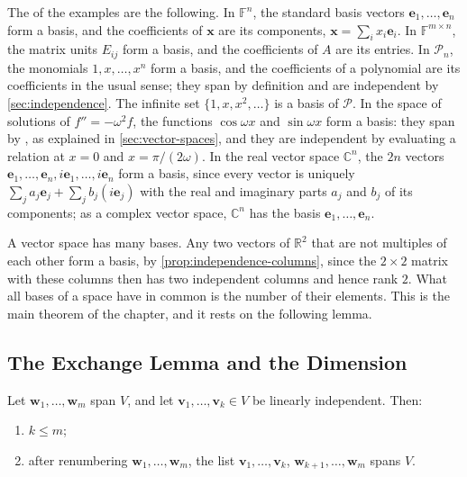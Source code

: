 The  of the examples are the following. In $\mathbb F^n$, the standard basis vectors $\mathbf e_1,\ldots,\mathbf e_n$ form a basis, and the coefficients of $\mathbf x$ are its components, $\mathbf x=\sum_ix_i\mathbf e_i$. In $\mathbb F^{m\times n}$, the matrix units $E_{ij}$ form a basis, and the coefficients of $A$ are its entries. In $\mathcal P_n$, the monomials $1,x,\ldots,x^n$ form a basis, and the coefficients of a polynomial are its coefficients in the usual sense; they span by definition and are independent by \cref{sec:independence}. The infinite set $\{1,x,x^2,\ldots\}$ is a basis of $\mathcal P$. In the space of solutions of $f''=-\omega^2f$, the functions $\cos\omega x$ and $\sin\omega x$ form a basis: they span by , as explained in \cref{sec:vector-spaces}, and they are independent by evaluating a relation at $x=0$ and $x=\pi/(2\omega)$. In the real vector space $\mathbb C^n$, the $2n$ vectors $\mathbf e_1,\ldots,\mathbf e_n,i\mathbf e_1,\ldots,i\mathbf e_n$ form a basis, since every vector is uniquely $\sum_ja_j\mathbf e_j+\sum_jb_j(i\mathbf e_j)$ with the real and imaginary parts $a_j$ and $b_j$ of its components; as a complex vector space, $\mathbb C^n$ has the basis $\mathbf e_1,\ldots,\mathbf e_n$.

A vector space has many bases. Any two vectors of $\mathbb R^2$ that are not multiples of each other form a basis, by \cref{prop:independence-columns}, since the $2\times2$ matrix with these columns then has two independent columns and hence rank $2$. What all bases of a space have in common is the number of their elements. This is the main theorem of the chapter, and it rests on the following lemma.

\subsection{The Exchange Lemma and the Dimension}

\begin{lemma}
\label{lem:steinitz}
Let $\mathbf w_1,\ldots,\mathbf w_m$ span $V$, and let $\mathbf v_1,\ldots,\mathbf v_k\in V$ be linearly independent. Then:
\begin{enumerate}
\item $k\le m$;
\item after renumbering $\mathbf w_1,\ldots,\mathbf w_m$, the list $\mathbf v_1,\ldots,\mathbf v_k$, $\mathbf w_{k+1},\ldots,\mathbf w_m$ spans $V$.
\end{enumerate}
\end{lemma}

